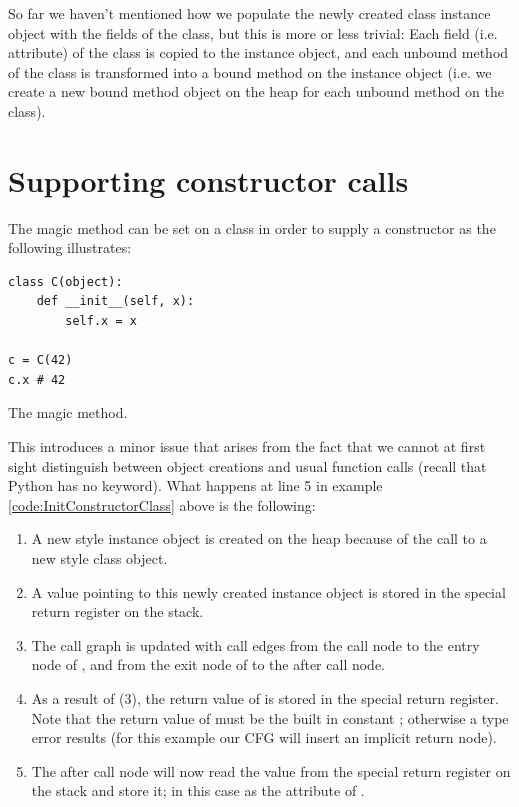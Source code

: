 So far we haven't mentioned how we populate the newly created class instance object with the fields of the class, but this is more or less trivial: Each field (i.e. attribute) of the class is copied to the instance object, and each unbound method of the class is transformed into a bound method on the instance object (i.e. we create a new bound method object on the heap for each unbound method on the class).


\section{Supporting constructor calls}
The magic method  can be set on a class in order to supply a constructor as the following illustrates:

\begin{listing}[H]
	\begin{verbatim}
class C(object):
	def __init__(self, x):
		self.x = x

c = C(42)
c.x # 42
	\end{verbatim}
	\caption{The  magic method.}\label{code:InitConstructorClass}
\end{listing}

This introduces a minor issue that arises from the fact that we cannot at first sight distinguish between object creations and usual function calls (recall that Python has no  keyword). What happens at line 5 in example \ref{code:InitConstructorClass} above is the following:

\begin{enumerate}
	\item A new style instance object is created on the heap because of the call to a new style class object.
	\item A value pointing to this newly created instance object is stored in the special return register on the stack.
	\item The call graph is updated with call edges from the call node to the entry node of , and from the exit node of  to the after call node.
	\item As a result of (3), the return value of  is stored in the special return register. Note that the return value of  must be the built in constant ; otherwise a type error results (for this example our CFG will insert an implicit return  node).
	\item The after call node will now read the value from the special return register on the stack and store it; in this case as the attribute  of .
\end{enumerate}

